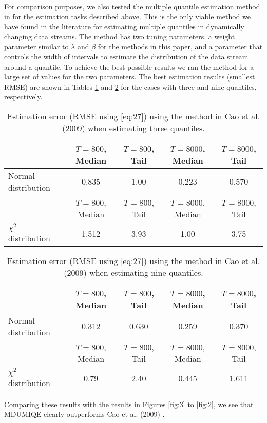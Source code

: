 \documentclass[10pt, a4paper]{article}
\newtheorem{rational for conjecture}{Rational for Conjecture}
\begin{document}
For comparison purposes, we also tested the multiple quantile estimation method in \cite{cao2009incremental} for the estimation tasks described above. This is the only viable method we have found in the literature for estimating multiple quantiles in dynamically changing data streams. The method has two tuning parameters, a weight parameter similar to $\lambda$ and $\beta$ for the methods in this paper, and a parameter that controls the width of intervals to estimate the distribution of the data stream around a quantile. To achieve the best possible results we ran the method for a large set of values for the two parameters. The best estimation results (smallest RMSE) are shown in Tables \ref{tab:1} and \ref{tab:2} for the cases with three and nine quantiles, respectively.
\begin{table}
  \centering
  \begin{tabular}{lcccc}
    & $T = 800$, Median & $T = 800$, Tail & $T = 8000$, Median & $T = 8000$, Tail  \\ \hline
Normal distribution & 0.835 & 1.00 & 0.223 & 0.570  \\[3mm]
    & $T = 800$, Median & $T = 800$, Tail & $T = 8000$, Median & $T = 8000$, Tail  \\ \hline
$\chi^2$ distribution & 1.512 & 3.93 & 1.00 &  3.75\\
  \end{tabular}
  \caption{Estimation error (RMSE using \eqref{eq:27}) using the method in Cao et al. (2009) \cite{cao2009incremental} when estimating three quantiles.}
  \label{tab:1}
\end{table}
\begin{table}
  \centering
  \begin{tabular}{lcccc}
    & $T = 800$, Median & $T = 800$, Tail & $T = 8000$, Median & $T = 8000$, Tail  \\ \hline
Normal distribution & 0.312 & 0.630 & 0.259 & 0.370  \\[3mm]
    & $T = 800$, Median & $T = 800$, Tail & $T = 8000$, Median & $T = 8000$, Tail  \\ \hline
$\chi^2$ distribution & 0.79 & 2.40 & 0.445 & 1.611 \\
  \end{tabular}
  \caption{Estimation error (RMSE using \eqref{eq:27}) using the method in Cao et al. (2009) \cite{cao2009incremental} when estimating nine quantiles.}
  \label{tab:2}
\end{table}
Comparing these results with the results in Figures \ref{fig:3} to \ref{fig:2}, we see that MDUMIQE clearly outperforms Cao et al. (2009) \cite{cao2009incremental}.
\end{document}
